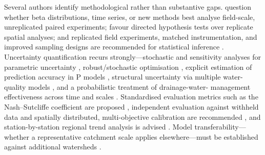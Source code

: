 \documentclass[11pt]{article}
\begin{document}
Several authors identify methodological rather than substantive gaps.
\textcite{Pagliari2021} question whether beta distributions, time series, or new
methods best analyse field-scale, unreplicated paired experiments;
\textcite{Andrus2014} favour directed hypothesis tests over replicate spatial
analyses; and replicated field experiments, matched instrumentation, and improved
sampling designs are recommended for statistical inference
\parencite{Okuda2020,Wamono2016b,Davis2019,Jacquemin2020}. Uncertainty
quantification recurs strongly---stochastic and sensitivity analyses for
parametric uncertainty \parencite{Gates2002,Burkhalter2006}, robust/stochastic
optimisation \parencite{Lei2026}, explicit estimation of prediction accuracy in P
models \parencite{Radcliffe2015}, structural uncertainty via multiple water-quality
models \parencite{Kujawa2020}, and a probabilistic treatment of drainage-water-
management effectiveness across time and scales \parencite{Shedekar2021}.
Standardised evaluation metrics such as the Nash--Sutcliffe coefficient are
proposed \parencite{STONE1995,SAVABI1995,Nazari2021}, independent evaluation
against withheld data and spatially distributed, multi-objective calibration are
recommended \parencite{Schoups2005}, and station-by-station regional trend
analysis is advised \parencite{Kumar2009}. Model transferability---whether a
representative catchment scale applies elsewhere---must be established against
additional watersheds \parencite{Basu2010,Thomas2016}.
\end{document}
